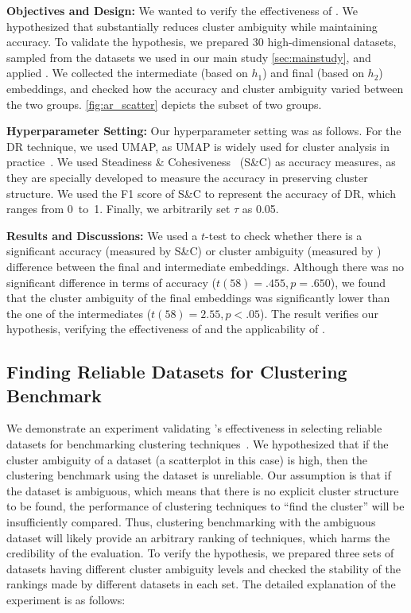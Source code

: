 \noindent 
\textbf{Objectives and Design:}
We wanted to verify the effectiveness of \ambreducer.
We hypothesized that \ambreducer substantially reduces cluster ambiguity while maintaining accuracy.
To validate the hypothesis, we prepared 30 high-dimensional datasets, sampled from the datasets we used in our main study \autoref{sec:mainstudy}, and applied \ambreducer.
We collected the intermediate (based on $h_1$) and final (based on $h_2$) embeddings, and checked how the accuracy and cluster ambiguity varied between the two groups.
\autoref{fig:ar_scatter} depicts the subset of two groups.

\noindent
\textbf{Hyperparameter Setting:}
Our hyperparameter setting was as follows. 
For the DR technique, we used UMAP, as UMAP is widely used for cluster analysis in practice~\cite{becht19nature, sanchez2020dimensionality}.
We used Steadiness \& Cohesiveness~\cite{jeon22tvcg} (S\&C) as accuracy measures, as they are specially developed to measure the accuracy in preserving cluster structure.
We used the F1 score of S\&C to represent the accuracy of DR, which ranges from 0~to~1.
Finally, we arbitrarily set $\tau$ as 0.05. 

\noindent
\textbf{Results and Discussions:}
We used a $t$-test to check whether there is a significant accuracy (measured by S\&C) or cluster ambiguity (measured by \measure) difference between the final and intermediate embeddings.
Although there was no significant difference  in terms of accuracy ($t(58)=.455, p = .650$), we found that the cluster ambiguity of the final embeddings was significantly lower than the one of the intermediates ($t(58)=2.55, p < .05$). 
The result verifies our hypothesis, verifying the effectiveness of \ambreducer and the applicability of \measure.


\subsection{Finding Reliable Datasets for Clustering Benchmark}
\label{sec:reliable}
% 
We demonstrate an experiment validating \measure's effectiveness in selecting reliable datasets for benchmarking clustering techniques~\cite{liu10icdm}.
We hypothesized that if the cluster ambiguity of a dataset (a scatterplot in this case) is high, then the clustering benchmark using the dataset is unreliable. 
Our assumption is that if the dataset is ambiguous, which means that there is no explicit cluster structure to be found, the performance of clustering techniques to ``find the cluster'' will be insufficiently compared. 
Thus, clustering benchmarking with the ambiguous dataset will likely provide an arbitrary ranking of techniques, which harms the credibility of the evaluation. 
To verify the hypothesis, we prepared three sets of datasets having different cluster ambiguity levels and checked the stability of the rankings made by different datasets in each set. 
The detailed explanation of the experiment is as follows:

